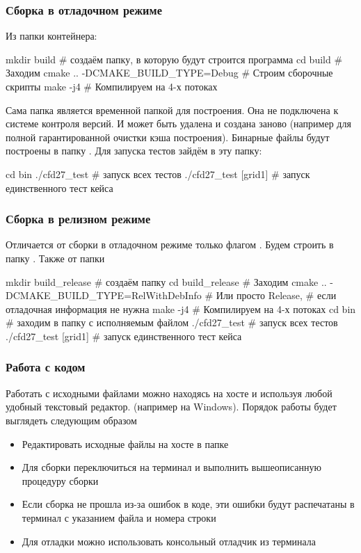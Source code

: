 \subsubsection{Сборка в отладочном режиме}
Из папки  контейнера:
\begin{shelloutput}
mkdir build                        # создаём папку, в которую будут строится программа
cd build                           # Заходим
cmake .. -DCMAKE_BUILD_TYPE=Debug  # Строим сборочные скрипты
make -j4                           # Компилируем на 4-х потоках
\end{shelloutput}
Сама папка  является временной папкой для построения.
Она не подключена к системе контроля версий.  И может быть удалена и создана заново (например для полной гарантированной очистки кэша построения).
Бинарные файлы будут построены в папку .
Для запуска тестов зайдём в эту папку:
\begin{shelloutput}
cd bin
./cfd27_test                # запуск всех тестов
./cfd27_test [grid1]        # запуск единственного тест кейса
\end{shelloutput}

\subsubsection{Сборка в релизном режиме}
\label{sec:debug_build}
Отличается от сборки в отладочном режиме только флагом .
Будем строить в папку .
Также от папки 
\begin{shelloutput}
mkdir build_release                         # создаём папку
cd build_release                            # Заходим
cmake .. -DCMAKE_BUILD_TYPE=RelWithDebInfo  # Или просто Release,
                                            # если отладочная информация не нужна
make -j4                                    # Компилируем на 4-х потоках
cd bin                                      # заходим в папку с исполняемым файлом
./cfd27_test                                # запуск всех тестов
./cfd27_test [grid1]                        # запуск единственного тест кейса
\end{shelloutput}

\subsubsection{Работа с кодом}
Работать с исходными файлами можно находясь на хосте и используя любой удобный текстовый редактор.
(например  на Windows).
Порядок работы будет выглядеть следующим образом
\begin{itemize}
\item Редактировать исходные файлы на хосте в папке 
\item Для сборки переключиться на терминал и выполнить вышеописанную процедуру сборки
\item Если сборка не прошла из-за ошибок в коде, эти ошибки будут распечатаны в терминал с указанием файла и номера строки
\item Для отладки можно использовать консольный отладчик  из терминала
\end{itemize}

